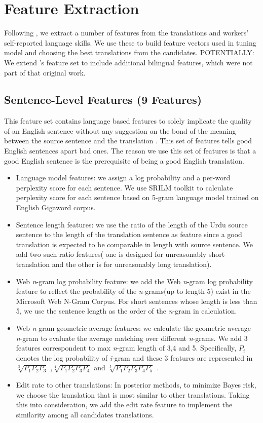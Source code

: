 \section{Feature Extraction}
Following , we extract a number of features from the translations and workers' self-reported language skills.  We use these to build feature vectors used in tuning model and choosing the best translations from the candidates. 
POTENTIALLY: We extend 's feature set to include additional bilingual features, which were not part of that original work.
\subsection{Sentence-Level Features (9 Features)}
This feature set contains language based features to solely implicate the quality of an English sentence without any suggestion on the bond of the meaning between the source sentence and the translation . This set of features tells good English sentences apart bad ones. The reason we use this set of features is that a good English sentence is the prerequisite of being a good English translation.
\begin{itemize}
\item Language model features:	we assign a log probability and a per-word perplexity score for each sentence. We use SRILM toolkit to calculate perplexity score for each sentence based on 5-gram language model trained on English Gigaword corpus.
\item Sentence length features:	we use the ratio of the length of the Urdu source sentence to the length of  the translation sentence as feature since a good translation is expected to be comparable in length with source sentence. We add two such ratio features( one is designed for unreasonably short translation and the other is for unreasonably long translation).
\item Web \textit{n}-gram log probability feature: we add the Web \textit{n}-gram log probability feature to reflect  the probability of the \textit{n}-grams(up to length 5) exist in the Microsoft Web N-Gram Corpus. For short sentences whose length is less than 5, we use the sentence length as the order of the \textit{n}-gram in calculation.
\item Web \textit{n}-gram geometric average features: we calculate the geometric average \textit{n}-gram  to evaluate the average matching over different \textit{n}-grams. We add 3 features correspondent to max \textit{n}-gram length of 3,4 and 5. Specifically, $P_i$ denotes the log probability of \textit{i}-gram and these 3 features are represented in $\sqrt[3]{P_1 P_2 P_3}$ ,$\sqrt[4]{P_1 P_2 P_3 P_4}$ and $\sqrt[5]{P_1 P_2 P_3 P_4 P_5}$ .
\item Edit rate to other translations: In posterior methods, to minimize Bayes risk, we choose the translation  that is most similar to other translations. Taking this into consideration, we add the edit rate feature to implement the similarity among all candidates translations.
\end{itemize}
